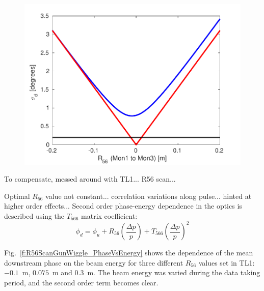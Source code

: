 \documentclass[%
 reprint,
 superscriptaddress,
 amsmath,
 amssymb,
 prstab,
]{revtex4-1}
\begin{document}
\begin{figure}
	\includegraphics[width=\columnwidth]{figs/prop/jitVsR56}
	\caption{\label{f:jitVsR56}
	}
\end{figure}


To compensate, messed around with TL1... R56 scan...

Optimal \(R_{56}\) value not constant... correlation variations along pulse... 
hinted at higher order effects... Second order phase-energy dependence in the 
optics is described using the \(T_{566}\) matrix coefficient:
\begin{equation}
\phi_d = \phi_u + R_{56}\left(\frac{\Delta p}{p}\right) + 
T_{566}\left(\frac{\Delta p}{p}\right)^2
\label{e:t566}
\end{equation}


Fig.~\ref{f:R56ScanGunWiggle_PhaseVsEnergy} shows the dependence of the mean 
downstream phase on the beam energy for three different \(R_{56}\) values set 
in TL1: \(-0.1\)~m, \(0.075\)~m and \(0.3\)~m. The beam energy was varied 
during the data taking period, and the second order term becomes clear.


\end{document}
